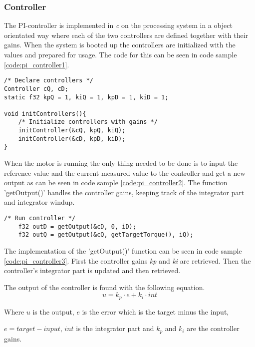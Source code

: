 \subsubsection{Controller}
\label{sec:embedded_control}
The PI-controller is implemented in \textit{c} on the processing system in a object orientated way where each of the two controllers are defined together with their gains. When the system is booted up the controllers are initialized with the values and prepared for usage. The code for this can be seen in code sample \ref{code:pi_controller1}.

\begin{lstlisting}[style=c, caption=Initialization of PI-controller., label=code:pi_controller1]
/* Declare controllers */
Controller cQ, cD;
static f32 kpQ = 1, kiQ = 1, kpD = 1, kiD = 1;

void initControllers(){
    /* Initialize controllers with gains */
    initController(&cQ, kpQ, kiQ);
    initController(&cD, kpD, kiD);
}
\end{lstlisting}

When the motor is running the only thing needed to be done is to input the reference value and the current measured value to the controller and get a new output as can be seen in code sample \ref{code:pi_controller2}. The function 'getOutput()' handles the controller gains, keeping track of the integrator part and integrator windup.

\begin{lstlisting}[style=c, caption=Usage of PI-controller., label=code:pi_controller2]
    /* Run controller */
	f32 outD = getOutput(&cD, 0, iD);
	f32 outQ = getOutput(&cQ, getTargetTorque(), iQ);
\end{lstlisting}

The implementation of the 'getOutput()' function can be seen in code sample \ref{code:pi_controller3}.
First the controller gains \textit{kp} and \textit{ki} are retrieved. Then the controller's integrator part is updated and then retrieved.

The output of the controller is found with the following equation.
\begin{equation}
    u = k_p \cdot e + k_i \cdot int
\end{equation}

Where $u$ is the output, $e$ is the error which is the target minus the input, 

$e = target - input$, $int$ is the integrator part and $k_p$ and $k_i$ are the controller gains.

